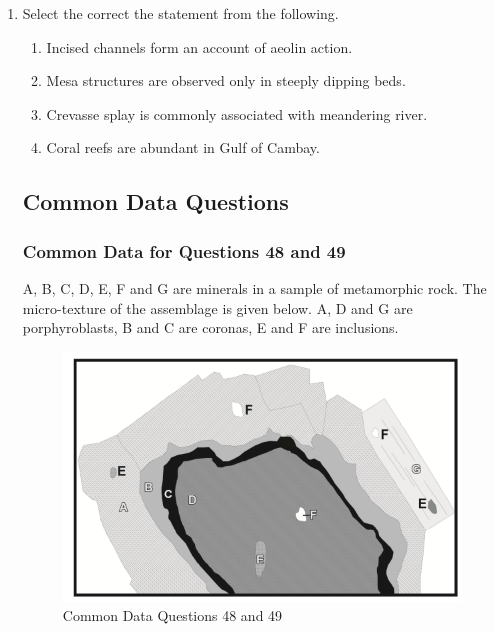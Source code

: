 \documentclass[journal,12pt,onecolumn]{IEEEtran}
\theoremstyle{remark}
\begin{document}
\begin{enumerate}
            \begin{enumerate}
            \end{enumerate}
        \item Select the correct the statement from the following. \hfill{}
            \begin{enumerate}
                \item Incised channels form an account of aeolin action.
                \item Mesa structures are observed only in steeply dipping beds.
                \item Crevasse splay is commonly associated with meandering river.
                \item Coral reefs are abundant in Gulf of Cambay.
            \end{enumerate}
            \newpage
\subsection*{Common Data Questions}
\subsubsection*{Common Data for Questions 48 and 49}

A, B, C, D, E, F and G are minerals in a sample of metamorphic rock. The micro-texture of the assemblage is given below. A, D and G are porphyroblasts, B and C are coronas, E and F are inclusions.

        \begin{figure}[h]
            \centering
            \includegraphics[width=1\linewidth]{Figs/fig4.png}
            \caption{Common Data Questions 48 and 49}
            \label{fig:placeholder_4}
        \end{figure}


\end{enumerate}
\end{document}
